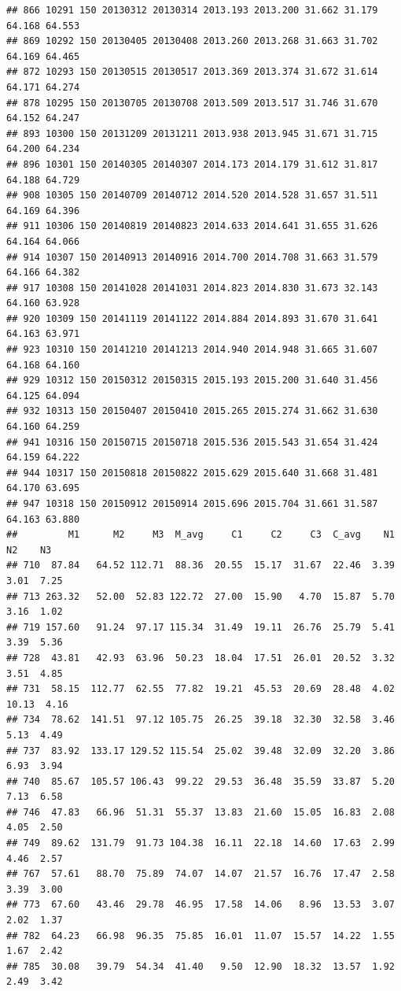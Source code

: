 \documentclass[]{article}
\begin{document}
\begin{verbatim}
## 866 10291 150 20130312 20130314 2013.193 2013.200 31.662 31.179 64.168 64.553
## 869 10292 150 20130405 20130408 2013.260 2013.268 31.663 31.702 64.169 64.465
## 872 10293 150 20130515 20130517 2013.369 2013.374 31.672 31.614 64.171 64.274
## 878 10295 150 20130705 20130708 2013.509 2013.517 31.746 31.670 64.152 64.247
## 893 10300 150 20131209 20131211 2013.938 2013.945 31.671 31.715 64.200 64.234
## 896 10301 150 20140305 20140307 2014.173 2014.179 31.612 31.817 64.188 64.729
## 908 10305 150 20140709 20140712 2014.520 2014.528 31.657 31.511 64.169 64.396
## 911 10306 150 20140819 20140823 2014.633 2014.641 31.655 31.626 64.164 64.066
## 914 10307 150 20140913 20140916 2014.700 2014.708 31.663 31.579 64.166 64.382
## 917 10308 150 20141028 20141031 2014.823 2014.830 31.673 32.143 64.160 63.928
## 920 10309 150 20141119 20141122 2014.884 2014.893 31.670 31.641 64.163 63.971
## 923 10310 150 20141210 20141213 2014.940 2014.948 31.665 31.607 64.168 64.160
## 929 10312 150 20150312 20150315 2015.193 2015.200 31.640 31.456 64.125 64.094
## 932 10313 150 20150407 20150410 2015.265 2015.274 31.662 31.630 64.160 64.259
## 941 10316 150 20150715 20150718 2015.536 2015.543 31.654 31.424 64.159 64.222
## 944 10317 150 20150818 20150822 2015.629 2015.640 31.668 31.481 64.170 63.695
## 947 10318 150 20150912 20150914 2015.696 2015.704 31.661 31.587 64.163 63.880
##         M1      M2     M3  M_avg     C1     C2     C3  C_avg    N1    N2    N3
## 710  87.84   64.52 112.71  88.36  20.55  15.17  31.67  22.46  3.39  3.01  7.25
## 713 263.32   52.00  52.83 122.72  27.00  15.90   4.70  15.87  5.70  3.16  1.02
## 719 157.60   91.24  97.17 115.34  31.49  19.11  26.76  25.79  5.41  3.39  5.36
## 728  43.81   42.93  63.96  50.23  18.04  17.51  26.01  20.52  3.32  3.51  4.85
## 731  58.15  112.77  62.55  77.82  19.21  45.53  20.69  28.48  4.02 10.13  4.16
## 734  78.62  141.51  97.12 105.75  26.25  39.18  32.30  32.58  3.46  5.13  4.49
## 737  83.92  133.17 129.52 115.54  25.02  39.48  32.09  32.20  3.86  6.93  3.94
## 740  85.67  105.57 106.43  99.22  29.53  36.48  35.59  33.87  5.20  7.13  6.58
## 746  47.83   66.96  51.31  55.37  13.83  21.60  15.05  16.83  2.08  4.05  2.50
## 749  89.62  131.79  91.73 104.38  16.11  22.18  14.60  17.63  2.99  4.46  2.57
## 767  57.61   88.70  75.89  74.07  14.07  21.57  16.76  17.47  2.58  3.39  3.00
## 773  67.60   43.46  29.78  46.95  17.58  14.06   8.96  13.53  3.07  2.02  1.37
## 782  64.23   66.98  96.35  75.85  16.01  11.07  15.57  14.22  1.55  1.67  2.42
## 785  30.08   39.79  54.34  41.40   9.50  12.90  18.32  13.57  1.92  2.49  3.42

\end{verbatim}
\end{document}
